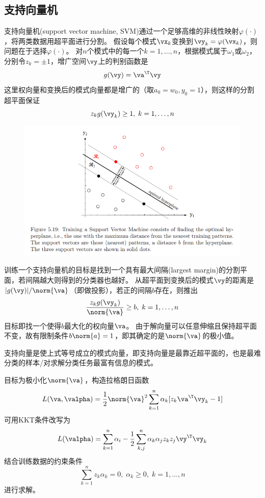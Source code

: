 \subsection{支持向量机}
支持向量机(support vector machine, SVM)通过一个足够高维的非线性映射$\varphi(\cdot)$，将两类数据用超平面进行分割。
假设每个模式$\vx_k$变换到$\vy_k=\varphi(\vx_k)$，则问题在于选择$\varphi(\cdot)$。
对$n$个模式中的每一个$k=1,\ldots,n$，根据模式属于$\omega_1$或$\omega_2$，分别令$z_k=\pm 1$，增广空间$\vy$上的判别函数是
\[g(\vy)=\va^\T\vy\]
这里权向量和变换后的模式向量都是增广的（取$a_0=w_0,y_0=1$），则这样的分割超平面保证
\[z_kg(\vy_k)\geq 1,\;k=1,\ldots,n\]
\begin{figure}[H]
\centering
\includegraphics[width=0.9\linewidth]{fig/SVM.png}
\end{figure}

训练一个支持向量机的目标是找到一个具有最大间隔(largest margin)的分割平面，若间隔越大则得到的分类器也越好。
从超平面到变换后的模式$\vy$的距离是$|g(\vy)|/\norm{\va}$（即做投影），若正的间隔$b$存在，则推出
\[\frac{z_kg(\vy_k)}{\norm{\va}}\geq b,\;k=1,\ldots,n\]
目标即找一个使得$b$最大化的权向量$\va$。
由于解向量可以任意伸缩且保持超平面不变，故有限制条件$b\norm{a}=1$，即其确定的是$\norm{\va}$的极小值。

支持向量是使上式等号成立的模式向量，即支持向量是最靠近超平面的，也是最难分类的样本/对求解分类任务最富有信息的模式。

目标为极小化$\norm{\va}$，构造拉格朗日函数
\[L(\va,\valpha)=\frac{1}{2}\norm{\va}^2\sum_{k=1}^n\alpha_k[z_k\va^\T\vy_k-1]\]
可用KKT条件改写为
\[L(\valpha)=\sum_{k=1}^n\alpha_i-\frac{1}{2}\sum_{k,j}^n\alpha_k\alpha_jz_kz_j\vy^\T\vy_k\]
结合训练数据的约束条件
\[\sum_{k=1}^nz_k\alpha_k=0,\;\alpha_k\geq 0,\;k=1,\ldots,n\]
进行求解。